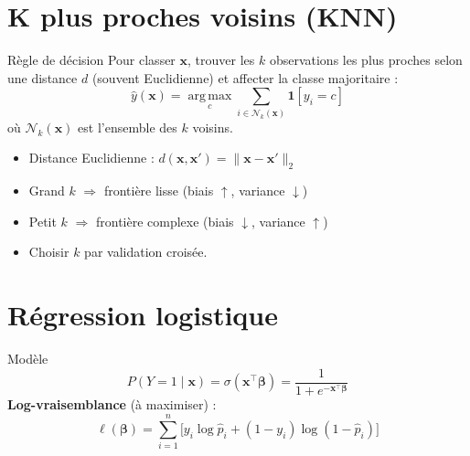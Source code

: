 \documentclass[10pt,a4paper,twocolumn]{article}
\newcommand{\argmax}{\operatorname*{arg\,max}}
\newcommand{\T}{^{\!\top}}   %
\begin{document}

\section{K plus proches voisins (KNN)}

\begin{formulebox}{Règle de décision}
Pour classer $\mathbf{x}$, trouver les $k$ observations les plus proches selon une distance $d$ (souvent Euclidienne) et affecter la classe majoritaire :
\[
\hat{y}(\mathbf{x}) = \argmax_{c} \sum_{i \in \mathcal{N}_k(\mathbf{x})} \mathbf{1}[y_i = c]
\]
où $\mathcal{N}_k(\mathbf{x})$ est l'ensemble des $k$ voisins.
\end{formulebox}

\begin{itemize}[leftmargin=*,itemsep=1pt]
  \item Distance Euclidienne : $d(\mathbf{x},\mathbf{x'}) = \|\mathbf{x}-\mathbf{x'}\|_2$
  \item Grand $k$ $\Rightarrow$ frontière lisse (biais $\uparrow$, variance $\downarrow$)
  \item Petit $k$ $\Rightarrow$ frontière complexe (biais $\downarrow$, variance $\uparrow$)
  \item Choisir $k$ par validation croisée.
\end{itemize}

\section{Régression logistique}

\begin{formulebox}{Modèle}
\[
P(Y=1 \mid \mathbf{x}) = \sigma(\mathbf{x}\T\bm{\beta}) = \frac{1}{1+e^{-\mathbf{x}\T\bm{\beta}}}
\]
\textbf{Log-vraisemblance} (à maximiser) :
\[
\ell(\bm{\beta}) = \sum_{i=1}^n \bigl[y_i \log \hat{p}_i + (1-y_i)\log(1-\hat{p}_i)\bigr]
\]
\end{formulebox}
\end{document}
